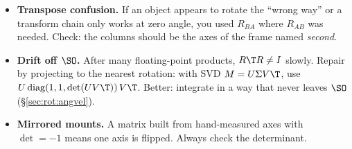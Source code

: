 \begin{pitfall}[s in practice]
\begin{itemize}
\item \textbf{Transpose confusion.} If an object appears to rotate the ``wrong way'' or a transform chain only works at zero angle, you used $R_{BA}$ where $R_{AB}$ was needed. Check: the columns should be the axes of the frame named \emph{second}.
\item \textbf{Drift off $\SO$.} After many floating-point products, $R\T R\neq I$ slowly. Repair by projecting to the nearest rotation: with SVD $M=U\Sigma V\T$, use $U\,\mathrm{diag}(1,1,\det(UV\T))\,V\T$. Better: integrate in a way that never leaves $\SO$ (\S\ref{sec:rot:angvel}).
\item \textbf{Mirrored mounts.} A matrix built from hand-measured axes with $\det=-1$ means one axis is flipped. Always check the determinant.
\end{itemize}
\end{pitfall}
